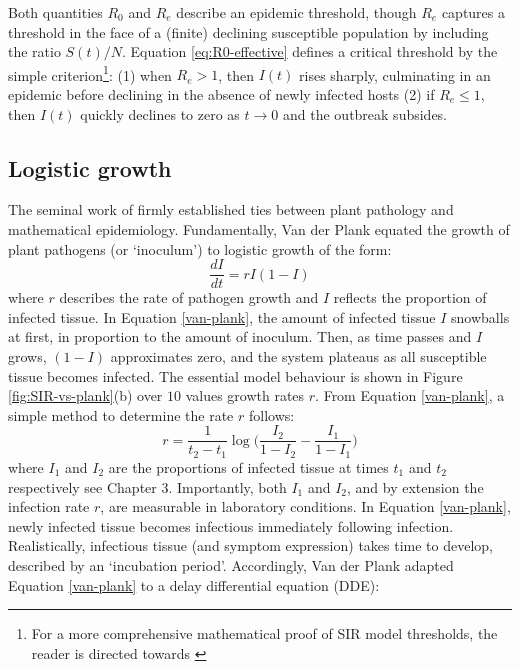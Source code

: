 Both quantities $R_0$ and $R_e$ describe an epidemic threshold, though $R_e$ captures a threshold in the face
of a (finite) declining susceptible population by including the ratio $S(t)/N$.
Equation \ref{eq:R0-effective} defines a critical threshold by the simple criterion\footnote{
For a more comprehensive mathematical proof of SIR
model thresholds, the reader is directed towards \cite{weiss2013sir}}:
(1) when $R_e > 1$, then $I(t)$ rises sharply, culminating in an epidemic before declining in the absence of newly
infected hosts
(2) if $R_e \leq 1$, then $I(t)$ quickly declines to zero as $t\rightarrow 0$ and the outbreak subsides.


\subsection{Logistic growth}
\label{sec:logistic-growth}
The seminal work of \cite{van2013plant} firmly established ties between plant pathology and 
mathematical epidemiology.
Fundamentally, Van der Plank equated the growth of plant pathogens (or `inoculum') to logistic growth of the form:
\begin{equation}
    \label{van-plank}
    \frac{dI}{dt} = rI(1 - I)
\end{equation}
where $r$ describes the rate of pathogen growth and $I$ reflects the proportion of infected tissue.
In Equation \ref{van-plank}, the amount of infected tissue $I$ snowballs at first, 
in proportion to the amount of inoculum. Then, as time passes and $I$ grows, $(1-I)$ approximates zero, 
and the system plateaus as all susceptible tissue becomes infected.
The essential model behaviour is shown in Figure \ref{fig:SIR-vs-plank}(b) over $10$ values growth rates $r$.
From Equation \ref{van-plank}, a simple method to determine the rate $r$ follows:
\begin{equation}
    \label{eq:van-plank-r}
    r =\frac{1}{t_2 - t_1} \log \Big(\frac{I_2}{1 - I_2} - \frac{I_1}{1 - I_1}\Big)
\end{equation}
where $I_1$ and $I_2$ are the proportions of infected tissue at times $t_1$ and $t_2$ respectively\textemdash 
see \cite{van2013plant} Chapter 3. Importantly, both $I_1$ and $I_2$, and by extension the infection rate $r$,
are measurable in laboratory conditions. 
In Equation \ref{van-plank}, newly infected tissue becomes infectious immediately following infection.
Realistically, infectious tissue (and symptom expression) takes time to develop, described by an `incubation period'.
Accordingly, Van der Plank adapted Equation \ref{van-plank} to a delay differential equation (DDE):
